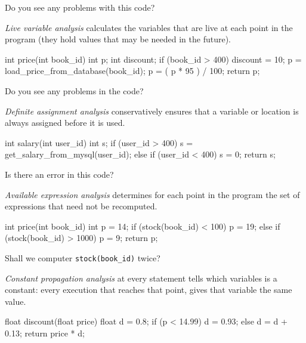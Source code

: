 \documentclass{article}
\begin{document}
Do you see any problems with this code?

\plush{}


\emph{Live variable analysis} calculates the variables that are live at each point in the program (they hold values that may be needed in the future).

{\small
\begin{ffcode}
int price(int book_id) {
  int p;
  int discount;
  if (book_id > 400)
    discount = 10;
  p = load_price_from_database(book_id);
  p = ( p * 95 ) / 100;
  return p;
}
\end{ffcode}
}

Do you see any problems in the code?

\plush{}


\emph{Definite assignment analysis} conservatively ensures that a variable or location is always assigned before it is used.

{\small
\begin{ffcode}
int salary(int user_id) {
  int s;
  if (user_id > 400) {
    s = get_salary_from_mysql(user_id);
  } else if (user_id < 400) {
    s = 0;
  }
  return s;
}
\end{ffcode}
}

Is there an error in this code?

\plush{}


\emph{Available expression analysis} determines for each point in the program the set of expressions that need not be recomputed.

{\small
\begin{ffcode}
int price(int book_id) {
  int p = 14;
  if (stock(book_id) < 100) {
    p = 19;
  } else if (stock(book_id) > 1000) {
    p = 9;
  }
  return p;
}
\end{ffcode}
}

Shall we computer \texttt{stock(book\_id)} twice?

\plush{}


\emph{Constant propagation analysis} at every statement tells which variables is a constant:
every execution that reaches that point, gives that variable the same value.

{\small
\begin{ffcode}
float discount(float price) {
  float d = 0.8;
  if (p < 14.99)
    d = 0.93;
  else
    d = d + 0.13;
  return price * d;
}
\end{ffcode}
}
\end{document}
